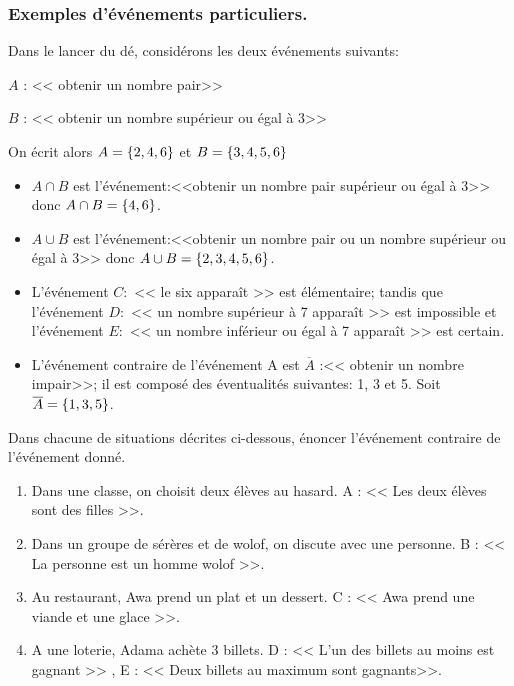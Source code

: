 \subsubsection*{Exemples d'événements particuliers.}
Dans le lancer du dé, considérons les deux événements suivants:
\begin{description}
\item $ A$ :  <<  obtenir un nombre pair>>
\item $ B $  :   <<  obtenir un nombre supérieur ou égal à 3>>
\end{description}
On écrit alors $ A=\left\{2,4,6\right\} $ et $ B=\left\{3,4,5,6\right\} $
\begin{itemize}
\item $ A\cap B $ est l'événement:<<obtenir un nombre pair supérieur ou égal à 3>>  donc $ A\cap B=\left\{4,6\right\} $.
\item  $ A\cup B $ est l'événement:<<obtenir un nombre pair ou  un nombre  supérieur ou égal à 3>>  donc $ A\cup B=\left\{2,3,4,5,6\right\} $.
\item  L'événement $ C: $  << le six apparaît >> est élémentaire; tandis que l'événement $ D: $  << un nombre  supérieur à 7 apparaît >> est impossible  et l'événement $ E: $  << un nombre inférieur ou égal à 7 apparaît >> est certain.
\item L'événement contraire de l'événement A est  $\overline{A}$ :<<  obtenir un nombre impair>>; il est composé des éventualités suivantes: 1, 3 et 5.\; Soit $\overline{A}=\left\{1,3,5\right\}$. 
\end{itemize}


\begin{exercice}

     Dans chacune de situations décrites ci-dessous, énoncer l'événement contraire de l'événement donné.
     \begin{enumerate}
\item Dans une classe, on choisit deux élèves au hasard. A : << Les deux élèves sont des filles >>.
\item Dans un groupe de sérères et de wolof, on discute avec une personne. B : << La personne est un homme wolof >>.
\item Au restaurant, Awa prend un plat et un dessert. C : << Awa prend une viande et une glace >>.
\item A une loterie, Adama achète 3 billets.
D : << L'un des billets au moins est gagnant >> , E : << Deux billets au maximum sont gagnants>>.
 \end{enumerate}
 \end{exercice}
 

